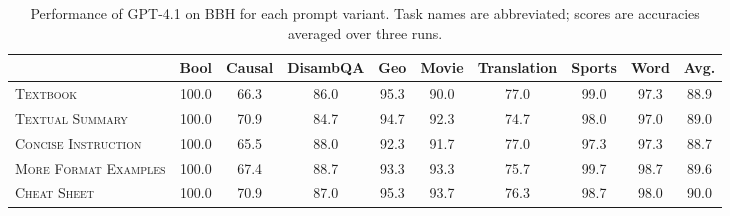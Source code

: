 \begin{table}[t]
\centering
\begin{adjustbox}{max width=1.0\textwidth}
\begin{tabular}{lccccccccc}
\toprule
 & \textbf{Bool} & \textbf{Causal} & \textbf{DisambQA} & \textbf{Geo} & \textbf{Movie} & \textbf{Translation} & \textbf{Sports} & \textbf{Word} & \textbf{Avg.} \\
\midrule
\textsc{Textbook} & 100.0 & 66.3 & 86.0 & 95.3 & 90.0 & 77.0 & 99.0 & 97.3 & 88.9 \\
\textsc{Textual Summary} & 100.0 & 70.9 & 84.7 & 94.7 & 92.3 & 74.7 & 98.0 & 97.0 & 89.0 \\
\textsc{Concise Instruction} & 100.0 & 65.5 & 88.0 & 92.3 & 91.7 & 77.0 & 97.3 & 97.3 & 88.7 \\
\textsc{More Format Examples} & 100.0 & 67.4 & 88.7 & 93.3 & 93.3 & 75.7 & 99.7 & 98.7 & 89.6 \\
\textsc{Cheat Sheet} & 100.0 & 70.9 & 87.0 & 95.3 & 93.7 & 76.3 & 98.7 & 98.0 & 90.0 \\
\bottomrule
\end{tabular}
\end{adjustbox}
\caption{
Performance of GPT-4.1 on BBH for each prompt variant.
Task names are abbreviated; scores are accuracies averaged over three runs.
}
\label{tab:prompt_var_results}
\end{table}